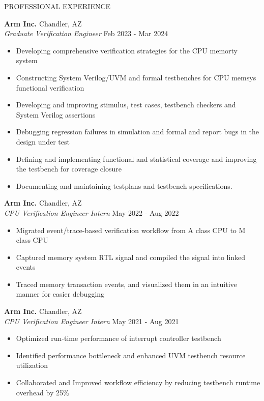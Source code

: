 \documentclass{resume} %
\begin{document}
  \begin{rSection}{PROFESSIONAL EXPERIENCE}

    \textbf{Arm Inc.}                           \hfill Chandler, AZ\\
    \emph{Graduate Verification Engineer}       \hfill Feb 2023 - Mar 2024\\
    \LineShrinkBeforeItem
    \begin{itemize} [leftmargin=1em]
      \itemsep -0.6em
      \item Developing comprehensive verification strategies for the CPU memorty system
      \item Constructing System Verilog/UVM and formal testbenches for CPU memsys functional verification
      \item Developing and improving stimulus, test cases, testbench checkers and System Verilog assertions
      \item Debugging regression failures in simulation and formal and report bugs in the design under test
      \item Defining and implementing functional and statistical coverage and improving the testbench for coverage closure
      \item Documenting and maintaining testplans and testbench specifications.
    \end{itemize}

    \textbf{Arm Inc.}                           \hfill Chandler, AZ\\
    \emph{CPU Verification Engineer Intern}     \hfill May 2022 - Aug 2022\\
    \LineShrinkBeforeItem
    \begin{itemize} [leftmargin=1em]
      \itemsep -0.6em
      \item Migrated event/trace-based verification workflow from A class CPU to M class CPU
      \item Captured memory system RTL signal and compiled the signal into linked events
      \item Traced memory transaction events, and visualized them in an intuitive manner for easier debugging
    \end{itemize}


    \textbf{Arm Inc.}                           \hfill Chandler, AZ\\
    \emph{CPU Verification Engineer Intern}     \hfill May 2021 - Aug 2021\\
    \LineShrinkBeforeItem
    \begin{itemize} [leftmargin=1em]
      \itemsep -0.6em
      \item Optimized run-time performance of interrupt controller testbench
      \item Identified performance bottleneck and enhanced UVM testbench resource utilization
      \item Collaborated and Improved workflow efficiency by reducing testbench runtime overhead by 25\%
    \end{itemize}

  \end{rSection}
\end{document}
